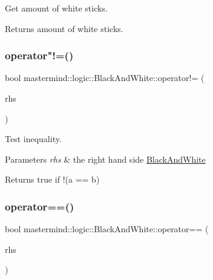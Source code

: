 Get amount of white sticks. 

\begin{DoxyReturn}{Returns}
amount of white sticks. 
\end{DoxyReturn}
\hypertarget{classmastermind_1_1logic_1_1_black_and_white_afd44562f412b49a86c51ffedea05c108}{}\label{classmastermind_1_1logic_1_1_black_and_white_afd44562f412b49a86c51ffedea05c108} 
\subsubsection{\texorpdfstring{operator"!=()}{operator!=()}}
{\footnotesize\ttfamily bool mastermind\+::logic\+::\+Black\+And\+White\+::operator!= (\begin{DoxyParamCaption}\item[{const \hyperlink{classmastermind_1_1logic_1_1_black_and_white}{Black\+And\+White} \&}]{rhs }\end{DoxyParamCaption})}



Test inequality. 


\begin{DoxyParams}{Parameters}
{\em rhs} & the right hand side \hyperlink{classmastermind_1_1logic_1_1_black_and_white}{Black\+And\+White} \\
\hline
\end{DoxyParams}
\begin{DoxyReturn}{Returns}
{\ttfamily true} if {\ttfamily !(a == b)} 
\end{DoxyReturn}
\hypertarget{classmastermind_1_1logic_1_1_black_and_white_a127a6e7852b3d5b7af42d8bb45ac1bfe}{}\label{classmastermind_1_1logic_1_1_black_and_white_a127a6e7852b3d5b7af42d8bb45ac1bfe} 
\subsubsection{\texorpdfstring{operator==()}{operator==()}\hspace{0.1cm}{\footnotesize\ttfamily [1/2]}}
{\footnotesize\ttfamily bool mastermind\+::logic\+::\+Black\+And\+White\+::operator== (\begin{DoxyParamCaption}\item[{const \hyperlink{classmastermind_1_1logic_1_1_black_and_white}{Black\+And\+White} \&}]{rhs }\end{DoxyParamCaption})}



